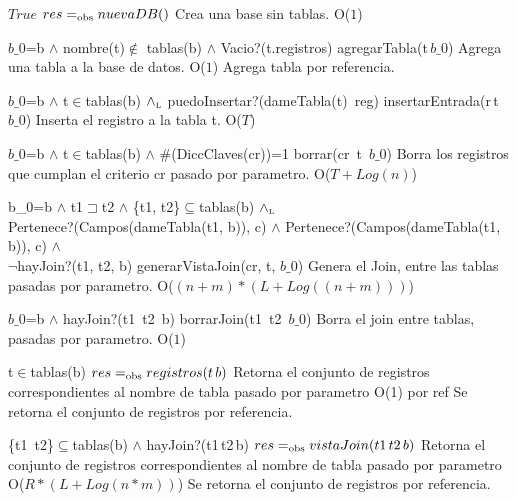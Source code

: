  
 {$True$}
 {$res =_{\mathrm{obs}} nuevaDB()$}
 {Crea una base sin tablas.}
 {O($1$)}
 {}

 {$b\_0$=b $\land$ nombre(t)$\notin$ tablas(b) $\land$ Vacio?(t.registros)}
 {agregarTabla(t\,$b\_0$)}
 {Agrega una tabla a la base de datos.}
 {O($1$)}
 {Agrega tabla por referencia.} 
 
 {$b\_0$=b $\land$ t$\in$tablas(b) $\land_{\mathrm{\scriptscriptstyle{L}}}$ puedoInsertar?(dameTabla(t)\, reg)}
 {insertarEntrada(r\,t \,$b\_0$)}
 {Inserta el registro a la tabla t.}
 {O($T$)}
 {} 
 
 {$b\_0$=b $\land$ t$\in$tablas(b) $\land$ \#(DiccClaves(cr))=1}
 {borrar(cr\, t\, $b\_0$)}
 {Borra los registros que cumplan el criterio cr pasado por parametro.}
 {O($T + Log(n)$)}
 {} 	

 {b\_0=b $\land$ t1$\sqsupset$t2 $\land$ \{t1, t2\}$\subseteq$tablas(b) $\land_{\mathrm{\scriptscriptstyle{L}}}$ \\Pertenece?(Campos(dameTabla(t1, b)), c) $\land$ Pertenece?(Campos(dameTabla(t1, b)), c) $\land$ \\$\neg$hayJoin?(t1, t2, b)}
 {generarVistaJoin(cr, t, $b\_0$)}
 {Genera el Join, entre las tablas pasadas por parametro.}
 {O($(n+m)*(L+Log((n+m)))$)}
 {} 	

 {$b\_0$=b $\land$ hayJoin?(t1\, t2\, b)}
 {borrarJoin(t1\, t2\, $b\_0$)}
 {Borra el join entre tablas, pasadas por parametro.}
 {O($1$)}
 {}


 {t$\in$tablas(b)}
 {$res =_{\mathrm{obs}} registros(t\, b)$}
 {Retorna el conjunto de registros correspondientes al nombre de tabla pasado por parametro}
 {O(1) por ref}
 {Se retorna el conjunto de registros por referencia.} 


 {\{t1\, t2\}$\subseteq$tablas(b) $\land$ hayJoin?(t1\,t2\,b)}
 {$res =_{\mathrm{obs}} vistaJoin(t1\, t2\, b)$}
 {Retorna el conjunto de registros correspondientes al nombre de tabla pasado por parametro}
 {O($R*(L+ Log(n*m))$)}
 {Se retorna el conjunto de registros por referencia.} 

